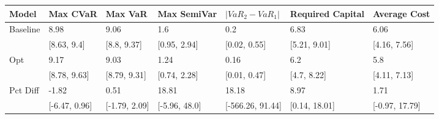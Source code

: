 \begin{tabular}{lllllll}
\toprule
   Model &      Max CVaR &       Max VaR &   Max SemiVar & $|VaR_2 - VaR_1|$ & Required Capital &   Average Cost \\
\midrule
Baseline &          8.98 &          9.06 &           1.6 &               0.2 &             6.83 &           6.06 \\
         &   [8.63, 9.4] &   [8.8, 9.37] &  [0.95, 2.94] &      [0.02, 0.55] &     [5.21, 9.01] &   [4.16, 7.56] \\
     Opt &          9.17 &          9.03 &          1.24 &              0.16 &              6.2 &            5.8 \\
         &  [8.78, 9.63] &  [8.79, 9.31] &  [0.74, 2.28] &      [0.01, 0.47] &      [4.7, 8.22] &   [4.11, 7.13] \\
Pct Diff &         -1.82 &          0.51 &         18.81 &             18.18 &             8.97 &           1.71 \\
         & [-6.47, 0.96] & [-1.79, 2.09] & [-5.96, 48.0] &  [-566.26, 91.44] &    [0.14, 18.01] & [-0.97, 17.79] \\
\bottomrule
\end{tabular}
